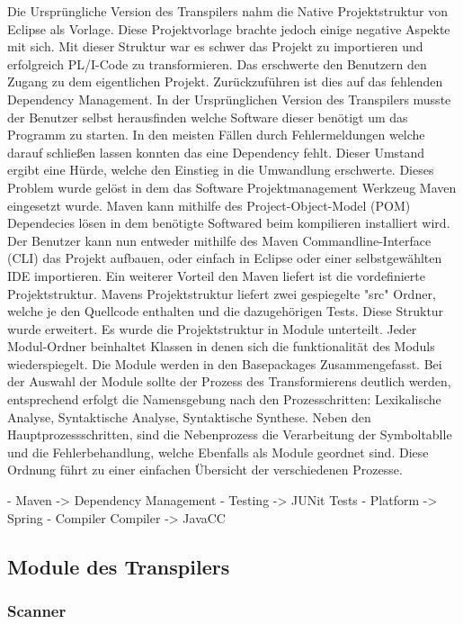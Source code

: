 Die Ursprüngliche Version des Transpilers nahm die Native Projektstruktur von Eclipse als Vorlage. Diese Projektvorlage brachte jedoch einige negative Aspekte mit sich. Mit dieser Struktur war es schwer das Projekt zu importieren und erfolgreich PL/I-Code zu transformieren. Das erschwerte den Benutzern den Zugang zu dem eigentlichen Projekt. 
Zurückzuführen ist dies auf das fehlenden Dependency Management. In der Ursprünglichen Version des Transpilers musste der Benutzer selbst herausfinden welche Software dieser benötigt um das Programm zu starten. In den meisten Fällen durch Fehlermeldungen welche darauf schließen lassen konnten das eine Dependency fehlt. Dieser Umstand ergibt eine Hürde, welche den Einstieg in die Umwandlung erschwerte. 
Dieses Problem wurde gelöst in dem das Software Projektmanagement Werkzeug Maven eingesetzt wurde. Maven kann mithilfe des Project-Object-Model (POM) Dependecies lösen in dem benötigte Softwared beim kompilieren installiert wird. Der Benutzer kann nun entweder mithilfe des Maven Commandline-Interface (CLI) das Projekt aufbauen, oder einfach in Eclipse oder einer selbstgewählten IDE importieren.
Ein weiterer Vorteil den Maven liefert ist die vordefinierte Projektstruktur. Mavens Projektstruktur liefert zwei gespiegelte "src" Ordner, welche je den Quellcode enthalten und die dazugehörigen Tests. Diese Struktur wurde erweitert. Es wurde die Projektstruktur in Module unterteilt. Jeder Modul-Ordner beinhaltet Klassen in denen sich die funktionalität des Moduls wiederspiegelt. Die Module werden in den Basepackages Zusammengefasst. Bei der Auswahl der Module sollte der Prozess des Transformierens deutlich werden, entsprechend erfolgt die Namensgebung nach den Prozesschritten: Lexikalische Analyse, Syntaktische Analyse, Syntaktische Synthese. Neben den Hauptprozessschritten, sind die Nebenprozess die Verarbeitung der Symboltablle und die Fehlerbehandlung, welche Ebenfalls als Module geordnet sind. Diese Ordnung führt zu einer einfachen Übersicht der verschiedenen Prozesse.

- Maven -> Dependency Management
- Testing -> JUNit Tests
- Platform -> Spring
- Compiler Compiler -> JavaCC

\subsection{Module des Transpilers}
\subsubsection{Scanner}

